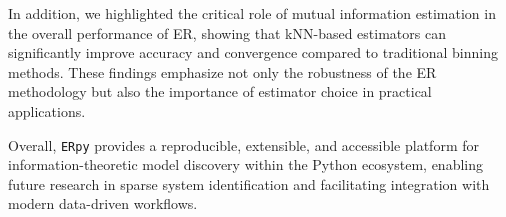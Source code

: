 \documentclass[11pt]{article}
\begin{document}
In addition, we highlighted the critical role of mutual information estimation in the overall performance of ER, showing that kNN-based estimators can significantly improve accuracy and convergence compared to traditional binning methods. These findings emphasize not only the robustness of the ER methodology but also the importance of estimator choice in practical applications.

Overall, \texttt{ERpy} provides a reproducible, extensible, and accessible platform for information-theoretic model discovery within the Python ecosystem, enabling future research in sparse system identification and facilitating integration with modern data-driven workflows.



\end{document}
